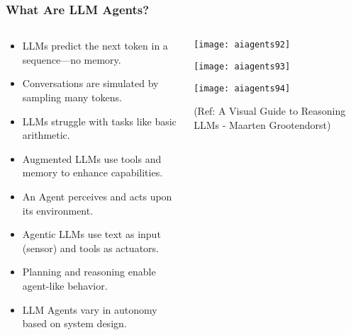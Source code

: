 \begin{frame}[fragile]\frametitle{What Are LLM Agents?}
\begin{columns}
    \begin{column}[T]{0.6\linewidth}
      \begin{itemize}
        \item LLMs predict the next token in a sequence—no memory.
        \item Conversations are simulated by sampling many tokens.
        \item LLMs struggle with tasks like basic arithmetic.
        \item Augmented LLMs use tools and memory to enhance capabilities.
        \item An Agent perceives and acts upon its environment.
        \item Agentic LLMs use text as input (sensor) and tools as actuators.
        \item Planning and reasoning enable agent-like behavior.
        \item LLM Agents vary in autonomy based on system design.
      \end{itemize}
    \end{column}
    \begin{column}[T]{0.4\linewidth}
        \begin{center}
        \texttt{[image: aiagents92]}
		
        \texttt{[image: aiagents93]}
		
        \texttt{[image: aiagents94]}
		
        {\tiny (Ref: A Visual Guide to Reasoning LLMs - Maarten Grootendorst)}
        \end{center}
    \end{column}
\end{columns}
\end{frame}


